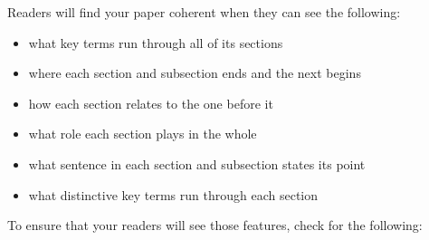 \documentclass[oneside]{book}
\numberwithin{equation}{section}
\begin{document}
Readers will find your paper coherent when they can see the following:
\begin{itemize}
    \item what key terms run through all of its sections
    \item where each section and subsection ends and the next begins
    \item how each section relates to the one before it
    \item what role each section plays in the whole
    \item what sentence in each section and subsection states its point
    \item what distinctive key terms run through each section
\end{itemize}
To ensure that your readers will see those features, check for the following:
\end{document}
